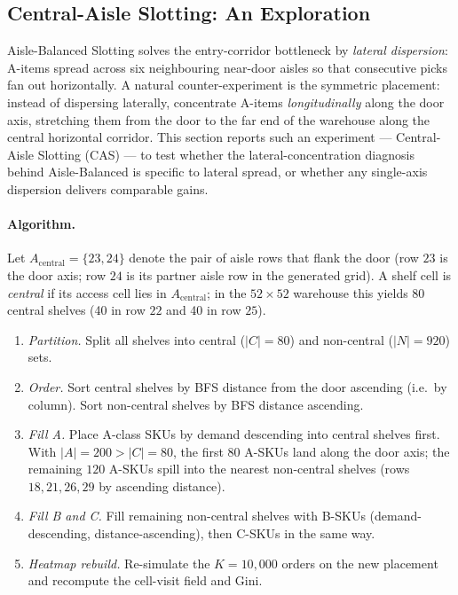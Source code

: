 \documentclass[12pt,a4paper]{article}
\begin{document}
\subsection{Central-Aisle Slotting: An Exploration}

Aisle-Balanced Slotting solves the entry-corridor bottleneck by \emph{lateral
dispersion}: A-items spread across six neighbouring near-door aisles so that
consecutive picks fan out horizontally.
A natural counter-experiment is the symmetric placement: instead of dispersing
laterally, concentrate A-items \emph{longitudinally} along the door axis,
stretching them from the door to the far end of the warehouse along the
central horizontal corridor.
This section reports such an experiment --- Central-Aisle Slotting (CAS) ---
to test whether the lateral-concentration diagnosis behind Aisle-Balanced is
specific to lateral spread, or whether any single-axis dispersion delivers
comparable gains.

\paragraph{Algorithm.}
Let $A_\text{central} = \{23, 24\}$ denote the pair of aisle rows that flank
the door (row $23$ is the door axis; row $24$ is its partner aisle row in the
generated grid).
A shelf cell is \emph{central} if its access cell lies in $A_\text{central}$;
in the $52 \times 52$ warehouse this yields $80$ central shelves (40 in row
$22$ and 40 in row $25$).
\begin{enumerate}
  \item \emph{Partition.} Split all shelves into central ($|C| = 80$) and
        non-central ($|N| = 920$) sets.
  \item \emph{Order.} Sort central shelves by BFS distance from the door
        ascending (i.e.\ by column).
        Sort non-central shelves by BFS distance ascending.
  \item \emph{Fill A.} Place A-class SKUs by demand descending into central
        shelves first.
        With $|A| = 200 > |C| = 80$, the first $80$ A-SKUs land along the
        door axis; the remaining $120$ A-SKUs spill into the nearest
        non-central shelves (rows $18, 21, 26, 29$ by ascending distance).
  \item \emph{Fill B and C.} Fill remaining non-central shelves with B-SKUs
        (demand-descending, distance-ascending), then C-SKUs in the same way.
  \item \emph{Heatmap rebuild.} Re-simulate the $K = 10{,}000$ orders on the
        new placement and recompute the cell-visit field and Gini.
\end{enumerate}
\end{document}
